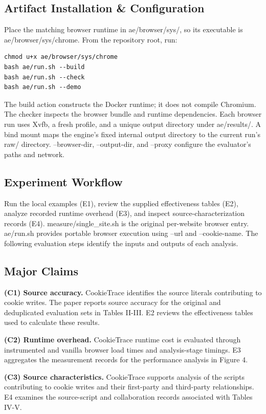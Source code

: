 \documentclass[conference]{IEEEtran}
\begin{document}
\subsection{Artifact Installation \& Configuration}
Place the matching browser runtime in ae/browser/sys/, so its executable is ae/browser/sys/chrome. From the repository root, run:

\begin{verbatim}
chmod u+x ae/browser/sys/chrome
bash ae/run.sh --build
bash ae/run.sh --check
bash ae/run.sh --demo
\end{verbatim}
The build action constructs the Docker runtime; it does not compile Chromium. The checker inspects the browser bundle and runtime dependencies. Each browser run uses Xvfb, a fresh profile, and a unique output directory under ae/results/. A bind mount maps the engine's fixed internal output directory to the current run's raw/ directory. --browser-dir, --output-dir, and --proxy configure the evaluator's paths and network.

\subsection{Experiment Workflow}
Run the local examples (E1), review the supplied effectiveness tables (E2), analyze recorded runtime overhead (E3), and inspect source-characterization records (E4). measure/single\_site.sh is the original per-website browser entry. ae/run.sh provides portable browser execution using --url and --cookie-name. The following evaluation steps identify the inputs and outputs of each analysis.

\subsection{Major Claims}
\noindent\textbf{(C1) Source accuracy.} CookieTrace identifies the source literals contributing to cookie writes. The paper reports source accuracy for the original and deduplicated evaluation sets in Tables II-III. E2 reviews the effectiveness tables used to calculate these results.

\noindent\textbf{(C2) Runtime overhead.} CookieTrace runtime cost is evaluated through instrumented and vanilla browser load times and analysis-stage timings. E3 aggregates the measurement records for the performance analysis in Figure 4.

\noindent\textbf{(C3) Source characteristics.} CookieTrace supports analysis of the scripts contributing to cookie writes and their first-party and third-party relationships. E4 examines the source-script and collaboration records associated with Tables IV-V.
\end{document}
